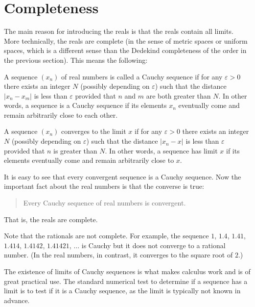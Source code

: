 \documentclass[12pt]{article}
\begin{document}
\section{Completeness}

The main reason for introducing the reals is that the reals contain all limits.
More technically, the reals are complete (in the sense of metric spaces or
uniform spaces, which is a different sense than the Dedekind completeness of
the order in the previous section). This means the following:
                                                                                
A sequence $(x_n)$ of real numbers is called a Cauchy sequence if for any
$\varepsilon > 0$
there exists an integer $N$ (possibly depending on $\varepsilon$) such that the
distance $|x_n - x_m|$ is less than $\varepsilon$ provided that $n$ and $m$ are
both greater than $N$. In other
words, a sequence is a Cauchy sequence if its elements $x_n$ eventually come
and remain arbitrarily close to each other.
                                                                                
A sequence $(x_n)$ converges to the limit $x$ if for any $\varepsilon > 0$
there exists an integer $N$ (possibly depending on $\varepsilon$) such that the
distance $|x_n - x|$ is less than $\varepsilon$ provided that $n$ is greater
than $N$. In other words, a sequence has limit $x$ if its elements eventually
come and remain arbitrarily close to $x$.
                                                                                
It is easy to see that every convergent sequence is a Cauchy sequence. Now the
important fact about the real numbers is that the converse is true:
\begin{quotation}
    Every Cauchy sequence of real numbers is convergent.
\end{quotation}
That is, the reals are complete.
                                                                                
Note that the rationals are not complete. For example, the sequence $1$, $1.4$,
$1.41$, $1.414$, $1.4142$, $1.41421$, $\ldots$ is Cauchy but it does not
converge to a rational number. (In the real numbers, in contrast, it converges
to the square root of $2$.)
                                                                                
The existence of limits of Cauchy sequences is what makes calculus work and is
of great practical use. The standard numerical test to determine if a sequence
has a limit is to test if it is a Cauchy sequence, as the limit is typically
not known in advance.
                                                                                
\end{document}
